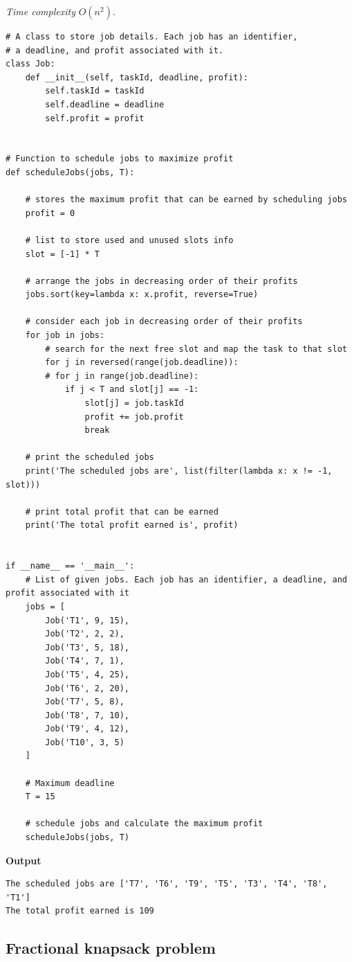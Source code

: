 \documentclass[a4paper,11pt]{book}
\begin{document}
\noindent \textit{Time complexity} $O(n^2)$.
\begin{lstlisting}
# A class to store job details. Each job has an identifier,
# a deadline, and profit associated with it.
class Job:
    def __init__(self, taskId, deadline, profit):
        self.taskId = taskId
        self.deadline = deadline
        self.profit = profit
 
 
# Function to schedule jobs to maximize profit
def scheduleJobs(jobs, T):
 
    # stores the maximum profit that can be earned by scheduling jobs
    profit = 0
 
    # list to store used and unused slots info
    slot = [-1] * T
 
    # arrange the jobs in decreasing order of their profits
    jobs.sort(key=lambda x: x.profit, reverse=True)
 
    # consider each job in decreasing order of their profits
    for job in jobs:
        # search for the next free slot and map the task to that slot
        for j in reversed(range(job.deadline)):
        # for j in range(job.deadline):
            if j < T and slot[j] == -1:
                slot[j] = job.taskId
                profit += job.profit
                break
 
    # print the scheduled jobs
    print('The scheduled jobs are', list(filter(lambda x: x != -1, slot)))
 
    # print total profit that can be earned
    print('The total profit earned is', profit)
 
 
if __name__ == '__main__':
    # List of given jobs. Each job has an identifier, a deadline, and profit associated with it
    jobs = [
        Job('T1', 9, 15), 
        Job('T2', 2, 2), 
        Job('T3', 5, 18), 
        Job('T4', 7, 1), 
        Job('T5', 4, 25),
        Job('T6', 2, 20), 
        Job('T7', 5, 8), 
        Job('T8', 7, 10), 
        Job('T9', 4, 12), 
        Job('T10', 3, 5)
    ]
 
    # Maximum deadline
    T = 15
 
    # schedule jobs and calculate the maximum profit
    scheduleJobs(jobs, T)
\end{lstlisting}
\textbf{Output}
\begin{lstlisting}
The scheduled jobs are ['T7', 'T6', 'T9', 'T5', 'T3', 'T4', 'T8', 'T1']
The total profit earned is 109
\end{lstlisting}

\subsection{Fractional knapsack problem}
\end{document}
